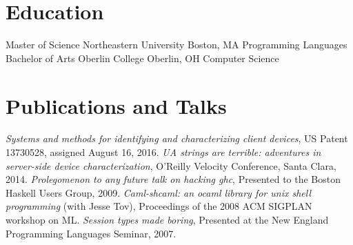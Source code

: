 \documentclass[10pt,letterpaper,sans]{moderncv}
\begin{document}
\section{Education}

        {Master of Science}
        {Northeastern University}
        {Boston, MA}
        {Programming Languages}
        {}
        {Bachelor of Arts}
        {Oberlin College}
        {Oberlin, OH}
        {Computer Science}
        {}

\section{Publications and Talks}

\cvitem{}
 {\emph{Systems and methods for identifying and characterizing client devices},
   US Patent 13730528, assigned August 16, 2016.}
\cvitem{}
 {\emph{UA strings are terrible: adventures in server-side device characterization},
   O'Reilly Velocity Conference, Santa Clara, 2014.}
\cvitem{}
 {\emph{Prolegomenon to any future talk on hacking ghc},
  Presented to the Boston Haskell Users Group, 2009.}
\cvitem{}
 {\emph{Caml-shcaml: an ocaml library for unix shell programming} (with Jesse Tov),
  Proceedings of the 2008 ACM SIGPLAN workshop on ML.}
\cvitem{}
 {\emph{Session types made boring},
  Presented at the New England Programming Languages Seminar, 2007.}
\end{document}
